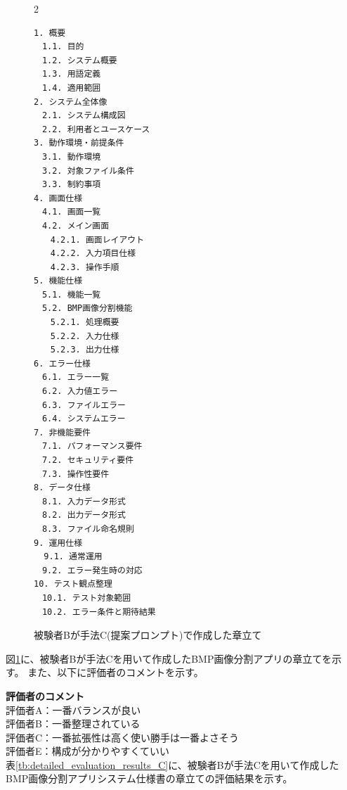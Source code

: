 \begin{figure}[tp]
\begin{tcolorbox}[
  colback=white,
  colframe=orange,
  fonttitle=\bfseries
]
\begin{multicols}{2}
\footnotesize
\ttfamily
\fontsize{8}{9}\selectfont
\begin{verbatim}
1. 概要
　1.1. 目的
　1.2. システム概要
　1.3. 用語定義
　1.4. 適用範囲
2. システム全体像
　2.1. システム構成図
　2.2. 利用者とユースケース
3. 動作環境・前提条件
　3.1. 動作環境
　3.2. 対象ファイル条件
　3.3. 制約事項
4. 画面仕様
　4.1. 画面一覧
　4.2. メイン画面
　　4.2.1. 画面レイアウト
　　4.2.2. 入力項目仕様
　　4.2.3. 操作手順
5. 機能仕様
　5.1. 機能一覧
　5.2. BMP画像分割機能
　　5.2.1. 処理概要
　　5.2.2. 入力仕様
　　5.2.3. 出力仕様
6. エラー仕様
　6.1. エラー一覧
　6.2. 入力値エラー
　6.3. ファイルエラー
　6.4. システムエラー
7. 非機能要件
　7.1. パフォーマンス要件
　7.2. セキュリティ要件
　7.3. 操作性要件
8. データ仕様
　8.1. 入力データ形式
　8.2. 出力データ形式
　8.3. ファイル命名規則
9. 運用仕様
  9.1. 通常運用
　9.2. エラー発生時の対応
10. テスト観点整理
　10.1. テスト対象範囲
　10.2. エラー条件と期待結果
\end{verbatim}
\end{multicols}
\end{tcolorbox}
\caption{被験者Bが手法C(提案プロンプト)で作成した章立て}
\label{fig:C_chapter_structure_of_bmp_app_1}
\end{figure}

図\ref{fig:C_chapter_structure_of_bmp_app_1}に、被験者Bが手法Cを用いて作成したBMP画像分割アプリの章立てを示す。
また、以下に評価者のコメントを示す。

\noindent\textbf{評価者のコメント}\\
評価者A：一番バランスが良い\\
評価者B：一番整理されている\\
評価者C：一番拡張性は高く使い勝手は一番よさそう\\
評価者E：構成が分かりやすくていい\\

表\ref{tb:detailed_evaluation_results_C}に、被験者Bが手法Cを用いて作成したBMP画像分割アプリシステム仕様書の章立ての評価結果を示す。


